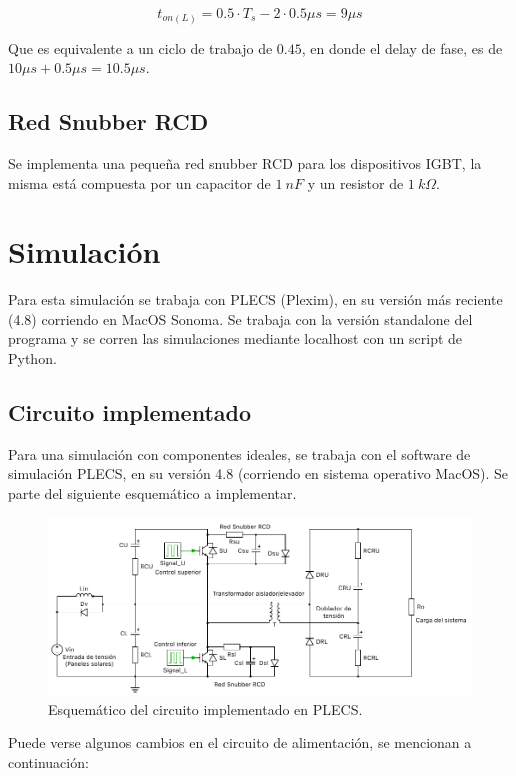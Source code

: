$$
t_{on(L)}=0.5\cdot T_s-2 \cdot 0.5 \mu s=9\mu s
$$

Que es equivalente a un ciclo de trabajo de $0.45$, en donde el delay de fase, es de $10 \mu s+0.5 \mu s=10.5 \mu s$.

\subsection{Red Snubber RCD}

Se implementa una pequeña red snubber RCD para los dispositivos IGBT, la misma está compuesta por un capacitor de $1 \ nF$ y un resistor de $1 \ k \Omega$.


\clearpage


\section{Simulación}

Para esta simulación se trabaja con PLECS (Plexim), en su versión más reciente (4.8) corriendo en MacOS Sonoma. Se trabaja con la versión standalone del programa y se corren las simulaciones mediante localhost con un script de Python.

\subsection{Circuito implementado}

Para una simulación con componentes ideales, se trabaja con el software de simulación PLECS, en su versión 4.8 (corriendo en sistema operativo MacOS). Se parte del siguiente esquemático a implementar. 

\begin{figure}
	\centering
	\includegraphics[width=1\linewidth]{img/schematic}
	\caption{Esquemático del circuito implementado en PLECS.}
	\label{fig:schematic}
\end{figure}

Puede verse algunos cambios en el circuito de alimentación, se mencionan a continuación:

